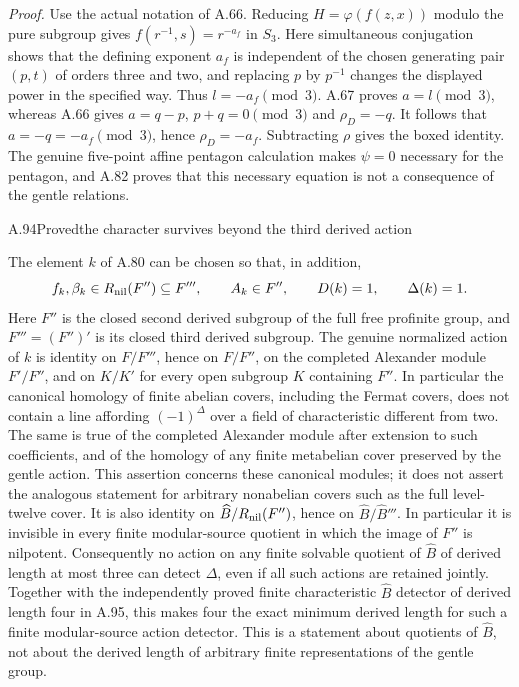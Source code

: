 \emph{Proof.}
Use the actual notation of A.66. Reducing
$H=\varphi(f(z,x))$ modulo the pure subgroup gives
$f(r^{-1},s)=r^{-a_f}$ in $S_3$. Here simultaneous conjugation
shows that the defining exponent $a_f$ is independent of the
chosen generating pair $(p,t)$ of orders three and two, and
replacing $p$ by $p^{-1}$ changes the displayed power in the
specified way. Thus $l=-a_f\pmod3$.
A.67 proves $a=l\pmod3$, whereas A.66 gives
$a=q-p$, $p+q=0\pmod3$ and $\rho_D=-q$.
It follows that $a=-q=-a_f\pmod3$, hence
$\rho_D=-a_f$. Subtracting $\rho$ gives the boxed identity.
The genuine five-point affine pentagon calculation makes
$\psi=0$ necessary for the pentagon, and A.82 proves that this
necessary equation is not a consequence of the gentle relations.

\begin{statement}{A.94}{Proved}{the character survives beyond the third derived action}
\end{statement}
The element $k$ of A.80 can be chosen so that, in addition,
\[
       f_k,\beta_k\in R_{\rm nil}(F'')\subseteq F''',
       \qquad A_k\in F'',
       \qquad D(k)=1,\qquad\Delta(k)=1.
\]
Here $F''$ is the closed second derived subgroup of the full
free profinite group, and $F'''=(F'')'$ is its closed third
derived subgroup. The genuine normalized action of $k$ is
identity on $F/F'''$, hence on $F/F''$, on the completed Alexander module
$F'/F''$, and on $K/K'$ for every open subgroup $K$ containing
$F''$. In particular the canonical homology of finite abelian
covers, including the Fermat covers, does not contain a line
affording $(-1)^\Delta$ over a field of characteristic different
from two. The same is true of the completed Alexander module
after extension to such coefficients, and of the homology of
any finite metabelian cover preserved by the gentle action.
This assertion concerns these canonical modules; it does not
assert the analogous statement for arbitrary nonabelian covers
such as the full level-twelve cover.
It is also identity on $\widehat B/R_{\rm nil}(F'')$, hence
on $\widehat B/\widehat B'''$. In particular it is invisible
in every finite modular-source quotient in which the image
of $F''$ is nilpotent.
Consequently no action on any finite solvable quotient of
$\widehat B$ of derived length at most three can detect
$\Delta$, even if all such actions are retained jointly.
Together with the independently proved finite characteristic
$\widehat B$ detector of derived length four in A.95, this
makes four the exact minimum derived length for such a
finite modular-source action detector. This is a statement
about quotients of $\widehat B$, not about the derived length
of arbitrary finite representations of the gentle group.

